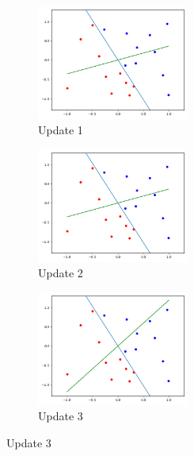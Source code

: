 \documentclass[12pt,letterpaper]{article}
\begin{document}
\begin{enumerate}[leftmargin=!,labelindent=5pt]
\begin{figure}[H]
        \begin{subfigure}{0.3\textwidth}
        \includegraphics[width=5cm]{images/myplot1.png} 
        \caption{Update 1}
        \label{fig:subim1}
        \end{subfigure}
        \begin{subfigure}{0.3\textwidth}
        \includegraphics[width=5cm]{images/myplot2.png}
        \caption{Update 2}
        \label{fig:subim2}
        \end{subfigure}
        \begin{subfigure}{0.3\textwidth}
        \includegraphics[width=5cm]{images/myplot3.png}
        \caption{Update 3}
        \label{fig:subim2}
        \end{subfigure}
         

\end{figure}
\end{enumerate}
\end{document}
